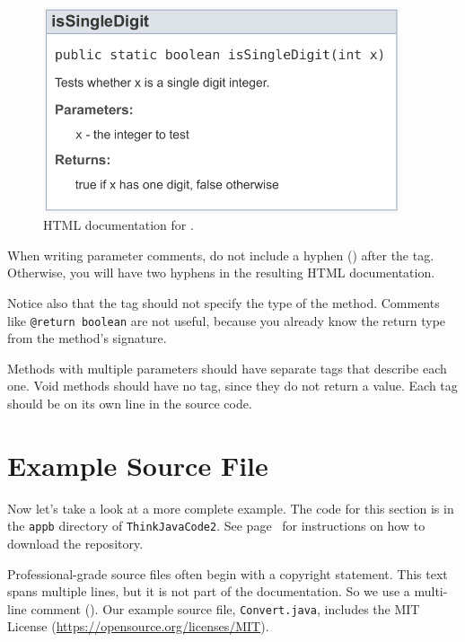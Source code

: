 \begin{figure}[!ht]
\begin{center}
\includegraphics[width=298pt]{figs/javadoc.pdf}
\caption{HTML documentation for .}
\label{fig.javadoc}
\end{center}
\end{figure}

When writing parameter comments, do not include a hyphen (\java{-}) after the  tag.
Otherwise, you will have two hyphens in the resulting HTML documentation.

Notice also that the  tag should not specify the type of the method.
Comments like \textcolor{comment}{\tt @return boolean} are not useful, because you already know the return type from the method's signature.

Methods with multiple parameters should have separate  tags that describe each one.
Void methods should have no  tag, since they do not return a value.
Each tag should be on its own line in the source code.


\section{Example Source File}

Now let's take a look at a more complete example.
The code for this section is in the {\tt appb} directory of {\tt ThinkJavaCode2}.
See page~\pageref{code} for instructions on how to download the repository.

Professional-grade source files often begin with a copyright statement.
This text spans multiple lines, but it is not part of the documentation.
So we use a multi-line comment (\java{/*}).
Our example source file, {\tt Convert.java}, includes the MIT License (\url{https://opensource.org/licenses/MIT}).


